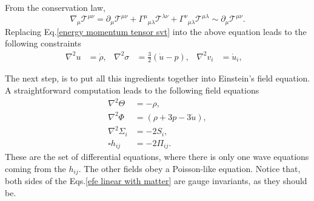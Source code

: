 \documentclass{article}
\begin{document}
From the conservation law, 
\begin{equation}
    \nabla_{\mu}\mathcal{T}^{\mu\nu} = \partial_{\mu}\mathcal{T}^{\mu\nu}
    + \Gamma^{\mu}{}_{\mu\lambda}\mathcal{T}^{\lambda\nu}
    + \Gamma^{\nu}{}_{\mu\lambda}\mathcal{T}^{\mu\lambda} \sim \partial_{\mu}\mathcal{T}^{\mu\nu}.
\end{equation}
Replacing Eq.\eqref{energy momentum tensor svt} into the above equation leads to the following
constraints
\begin{align}
    \nabla^{2}u & = \dot{\rho}, & 
    \nabla^{2}\sigma & = \frac{3}{2}\left(\dot{u} - p\right), & 
    \nabla^{2}v_{i} & = \dot{u}_{i}, & 
\end{align}

The next step, is to put all this ingredients together into Einstein's field equation. A 
straightforward computation leads to the following field equations
\begin{align}
    \label{efe linear with matter}
    \nabla^2 \Theta & = -\rho, \\
    \nabla^2 \Phi & = \left(\rho + 3p - 3\dot{u}\right), \\
    \nabla^2 \Sigma_{i} & = - 2S_{i}, \\
    \square h_{ij} & = -2\Pi_{ij}.
\end{align}
These are the set of differential equations, where there is only one wave equations coming
from the $h_{ij}$. The other fields obey a Poisson-like equation. Notice that, both sides of 
the Eqs.\eqref{efe linear with matter} are gauge invariants, as they should be.




\end{document}
